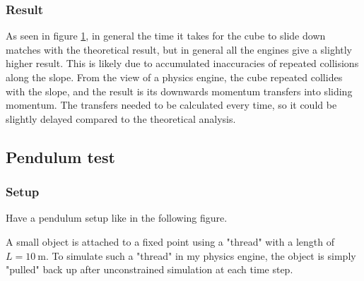 \documentclass[12pt,a4paper,twoside,openright]{report}
\begin{document}
\subsubsection{Result}

\begin{figure} 
    \captionsetup{labelsep=none}
    \begin{center}
      \end{center}
      \caption{}
      \label{ev3}
    \end{figure}

As seen in figure \ref{ev3}, in general the time it takes for the cube to slide down matches with the theoretical result, but in general all the engines give a slightly higher result. This is likely due to accumulated inaccuracies of repeated collisions along the slope. From the view of a physics engine, the cube repeated collides with the slope, and the result is its downwards momentum transfers into sliding momentum. The transfers needed to be calculated every time, so it could be slightly delayed compared to the theoretical analysis.

\subsection{Pendulum test}

\subsubsection{Setup}

Have a pendulum setup like in the following figure.

A small object is attached to a fixed point using a "thread" with a length of $L=\SI{10}{\m}$. To simulate such a "thread" in my physics engine, the object is simply "pulled" back up after unconstrained simulation at each time step.
\end{document}

